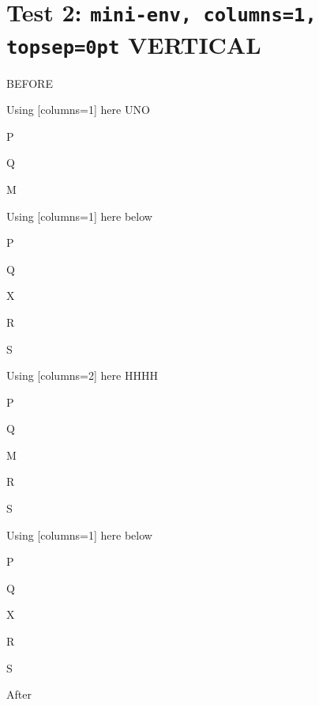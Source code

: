 \documentclass[10pt]{article}
\begin{document}
\section{Test 2: \texttt{mini-env, columns=1, topsep=0pt} VERTICAL}

BEFORE
\begin{enumext}[columns=2]
\item Using [columns=1] here UNO

  \begin{enumext}[columns=1,topsep=0pt]%
     \item  P \item Q \item M%
  \end{enumext}

\item Using [columns=1] here below

\begin{enumext}[columns=1]%
     \item  P \item Q \item X  \item R \item S
  \end{enumext}

\columnbreak

\item Using [columns=2] here HHHH

  \begin{enumext}[columns=2,topsep=0pt]%
    \item  P \item Q \item M \item R \item S
  \end{enumext}

\item Using [columns=1] here below

\begin{enumext}[columns=1]%
     \item  P \item Q \item X  \item R \item S
  \end{enumext}

\end{enumext}
After
\end{document}
